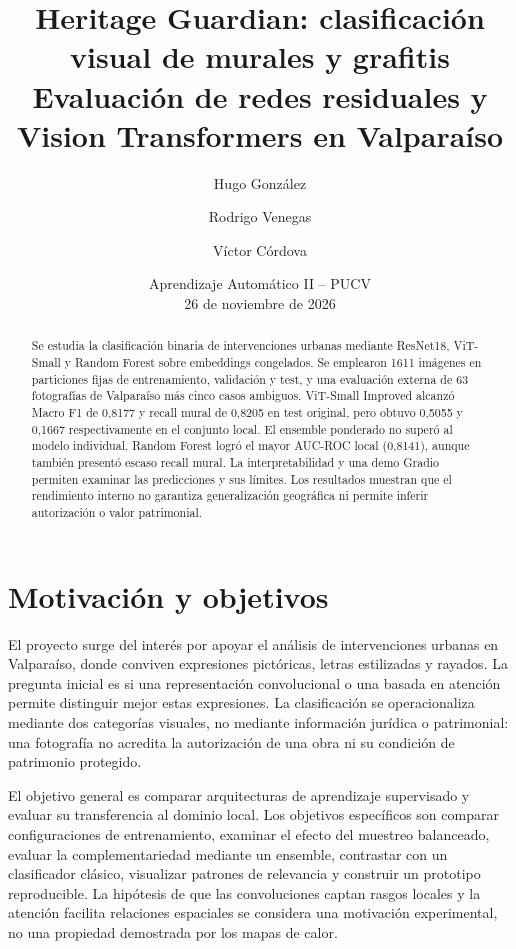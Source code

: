 \documentclass[10pt,a4paper]{article}
\title{\vspace{-1.2cm}\textbf{Heritage Guardian: clasificación visual de murales y grafitis}\\\large Evaluación de redes residuales y Vision Transformers en Valparaíso}
\author{Hugo González \and Rodrigo Venegas \and Víctor Córdova}
\date{Aprendizaje Automático II -- PUCV\\26 de noviembre de 2026}
\begin{document}
\maketitle
\begin{abstract}
Se estudia la clasificación binaria de intervenciones urbanas mediante ResNet18, ViT-Small y Random Forest sobre embeddings congelados. Se emplearon 1611 imágenes en particiones fijas de entrenamiento, validación y test, y una evaluación externa de 63 fotografías de Valparaíso más cinco casos ambiguos. ViT-Small Improved alcanzó Macro F1 de 0,8177 y recall mural de 0,8205 en test original, pero obtuvo 0,5055 y 0,1667 respectivamente en el conjunto local. El ensemble ponderado no superó al modelo individual. Random Forest logró el mayor AUC-ROC local (0,8141), aunque también presentó escaso recall mural. La interpretabilidad y una demo Gradio permiten examinar las predicciones y sus límites. Los resultados muestran que el rendimiento interno no garantiza generalización geográfica ni permite inferir autorización o valor patrimonial.
\end{abstract}
\section{Motivación y objetivos}
El proyecto surge del interés por apoyar el análisis de intervenciones urbanas en Valparaíso, donde conviven expresiones pictóricas, letras estilizadas y rayados. La pregunta inicial es si una representación convolucional o una basada en atención permite distinguir mejor estas expresiones. La clasificación se operacionaliza mediante dos categorías visuales, no mediante información jurídica o patrimonial: una fotografía no acredita la autorización de una obra ni su condición de patrimonio protegido.

El objetivo general es comparar arquitecturas de aprendizaje supervisado y evaluar su transferencia al dominio local. Los objetivos específicos son comparar configuraciones de entrenamiento, examinar el efecto del muestreo balanceado, evaluar la complementariedad mediante un ensemble, contrastar con un clasificador clásico, visualizar patrones de relevancia y construir un prototipo reproducible. La hipótesis de que las convoluciones captan rasgos locales y la atención facilita relaciones espaciales se considera una motivación experimental, no una propiedad demostrada por los mapas de calor.
\end{document}
